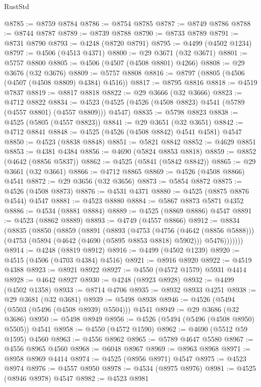 \begin{lexlean}{RustStd}
\begin{coremodule}
{\begin{coremodule}
{{{{{{{{{{{{{{{{{{{{{{{{{{{{{{{{{{{{{{{{{{{{{{{{{{{{{{{@8785 := @8759 @8784
@8786 := @8754 @8785
@8787 := @8749 @8786
@8788 := @8744 @8787
@8789 := @8739 @8788
@8790 := @8733 @8789
@8791 := @8731 @8790
@8793 := @4248 (@8720 @8791)
@8795 := @4499 (@4502 @1234)
@8797 := @4506 (@4513 @4371)
@8800 := @29 @3671 (@32 @3671)
@8801 := @5757 @8800
@8805 := @4506 (@4507 (@4508 @8801) @4266)
@8808 := @29 @3676 (@32 @3676)
@8809 := @5757 @8808
@8816 := @8797 (@8805 (@4506 (@4507 (@4508 @8809) @4384) @4516))
@8817 := @8795 @8816
@8818 := @4519 @7837
@8819 := @8817 @8818
@8822 := @29 @3666 (@32 @3666)
@8823 := @4712 @8822
@8834 := @4523 (@4525 (@4526 (@4508 @8823) @4541 (@5789 (@4557 @8801) (@4557 @8809))) @4547)
@8835 := @5798 @8823
@8838 := @4525 (@5805 (@4557 @8823))
@8841 := @29 @3651 (@32 @3651)
@8842 := @4712 @8841
@8848 := @4525 (@4526 (@4508 @8842) @4541 @4581) @4547
@8850 := @4523 (@8838 @8848)
@8851 := @5821 @8842
@8852 := @4629 @8851
@8853 := @4381 @4384
@8856 := @4690 (@5824 @8853 @8818)
@8859 := @8852 (@4642 (@8856 @5837))
@8862 := @4525 (@5841 (@5842 @8842))
@8865 := @29 @3661 (@32 @3661)
@8866 := @4712 @8865
@8869 := @4526 (@4508 @8866) @4541
@8872 := @29 @3656 (@32 @3656)
@8873 := @5854 @8872
@8875 := @4526 (@4508 @8873)
@8876 := @4531 @4371
@8880 := @4525 (@8875 @8876 @4544) @4547
@8881 := @4523 @8880
@8884 := @5867 @8873 @5871 @4352
@8886 := @4534 (@8881 @8884)
@8889 := @4525 (@8869 @8886) @4547
@8891 := @4523 (@8862 @8889)
@8893 := @4749 (@4557 @8866)
@8912 := @8834
    (@8835
      (@8850
        (@8859
          (@8891
            (@8893
              (@4753
                (@4756 (@4642 (@8856 @5888)))
                (@4753 (@5894 (@4642 (@4690 (@5895 @8853 @8818) @5902))) @5476)))))))
@8914 := @4248 (@8819 @8912)
@8916 := @4499 (@4502 @1239)
@8920 := @4515 (@4506 (@4703 @4384) @4516)
@8921 := @8916 @8920
@8922 := @4519 @4388
@8923 := @8921 @8922
@8927 := @4550 (@4572 @1579) @5931 @4414
@8928 := @4642 @8927
@8930 := @4248 (@8923 @8928)
@8932 := @4499 (@4502 @1358)
@8933 := @8714 @4706
@8935 := @8932 @8933 @4251
@8938 := @29 @3681 (@32 @3681)
@8939 := @5498 @8938
@8946 := @4526 (@5494 (@5503 (@5496 (@4508 @8939) @5504))) @4541
@8949 := @29 @3686 (@32 @3686)
@8950 := @5498 @8949
@8956 := @4526 (@5494 (@5496 (@4508 @8950) @5505)) @4541
@8958 := @4550 (@4572 @1590)
@8962 := @4690 (@5512 @59 @1595) @4560
@8963 := @4556 @8962
@8965 := @5789 @4647 @5580
@8967 := @4556 @8965 @4560
@8968 := @6048 @8967
@8969 := @8963 @8968
@8971 := @8958 @8969 @4414
@8974 := @4525 (@8956 @8971) @4547
@8975 := @4523 @8974
@8976 := @4557 @8950
@8978 := @4534 (@8975 @8976)
@8981 := @4525 (@8946 @8978) @4547
@8982 := @4523 @8981
}}}}}}}}}}}}}}}}}}}}}}}}}}}}}}}}}}}}}}}}}}}}}}}}}}}}}}}
\end{coremodule}}
\end{coremodule}
\end{lexlean}
